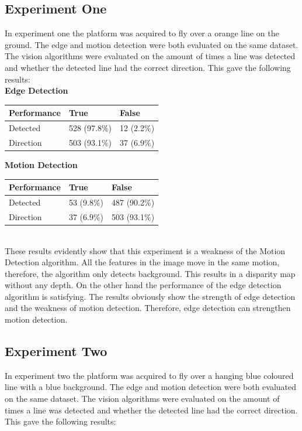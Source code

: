 \documentclass[a4paper]{article}
\begin{document}
\subsection{Experiment One}
In experiment one the platform was acquired to fly over a orange line on the ground. The edge and motion detection were both evaluated on the same dataset. The vision algorithms were evaluated on the amount of times a line was detected and whether the detected line had the correct direction. This gave the following results:\\

\noindent\textbf{Edge Detection}\\
\begin{tabular}{| l | l | l |}
\hline
\textbf{Performance} & True & False\\
\hline
Detected  & 528 (97.8\%) & 12 (2.2\%)\\
\hline
Direction & 503 (93.1\%) & 37 (6.9\%) \\
\hline
\end{tabular}
\newpage
\noindent\textbf{Motion Detection}\\
\begin{tabular}{| l | l | l |}
\hline
\textbf{Performance} & True & False\\
\hline
Detected  & 53 (9.8\%) & 487 (90.2\%)\\
\hline
Direction & 37 (6.9\%) & 503 (93.1\%) \\
\hline
\end{tabular}\\

These results evidently show that this experiment is a weakness of the Motion Detection algorithm. All the features in the image move in the same motion, therefore, the algorithm only detects background. This results in a disparity map without any depth. On the other hand the performance of the edge detection algorithm is satisfying. The results obviously show the strength of edge detection and the weakness of motion detection. Therefore, edge detection can strengthen motion detection.

\subsection{Experiment Two}
In experiment two the platform was acquired to fly over a hanging blue coloured line with a blue background. The edge and motion detection were both evaluated on the same dataset. The vision algorithms were evaluated on the amount of times a line was detected and whether the detected line had the correct direction. This gave the following results:\\
\end{document}
